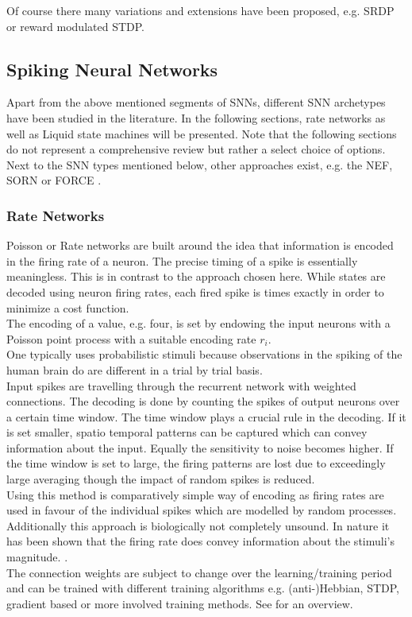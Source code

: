 Of course there many variations and extensions have been proposed, e.g. \ac{SRDP}\cite{kempter_hebbian_1999} or reward modulated \ac{STDP}\cite{legenstein_learning_2008}.


\subsection{Spiking Neural Networks}
Apart from the above mentioned segments of \acp{SNN}, different \ac{SNN} archetypes have been studied in the literature. In the following sections, rate networks as well as Liquid state machines will be presented. Note that the following sections do not represent a comprehensive review but rather a select choice of options. Next to the \ac{SNN} types mentioned below, other approaches exist, e.g. the \ac{NEF}\cite{eliasmith_neural_2004}, SORN\cite{lazar_sorn_2009} or FORCE \cite{nicola_supervised_2017}.
\subsubsection{Rate Networks}
Poisson or Rate networks are built around the idea that information is encoded in the firing rate of a neuron. The precise timing of a spike is essentially meaningless\cite{brette_philosophy_2015}. This is in contrast to the approach chosen here. While states are decoded using neuron firing rates, each fired spike is times exactly in order to minimize a cost function.\\
The encoding of a value, e.g. four, is set by endowing the input neurons with a Poisson point process with a suitable encoding rate $r_i$\cite{deneve_efficient_2016}.\\
One typically uses probabilistic stimuli because observations in the spiking of the human brain do are different in a trial by trial basis.\\
Input spikes are travelling through the recurrent network with weighted connections. The decoding is done by counting the spikes of output neurons over a certain time window. The time window plays a crucial rule in the decoding. If it is set smaller, spatio temporal patterns can be captured which can convey information about the input. Equally the sensitivity to noise becomes higher. If the time window is set to large, the firing patterns are lost due to exceedingly large averaging though the impact of random spikes is reduced.\\
Using this method is comparatively simple way of encoding as firing rates are used in favour of the individual spikes which are modelled by random processes. Additionally this approach is biologically not completely unsound. In nature it has been shown that the firing rate does convey information about the stimuli's magnitude. \cite{adrian_impulses_1926}.\\
The connection weights are subject to change over the learning/training period\cite{almomani_comparative_2019} and can be trained with different training algorithms e.g. (anti-)Hebbian, \ac{STDP}, gradient based or more involved training methods\cite{demin_recurrent_2018}. See \cite{yi_learning_2023} for an overview.\\


